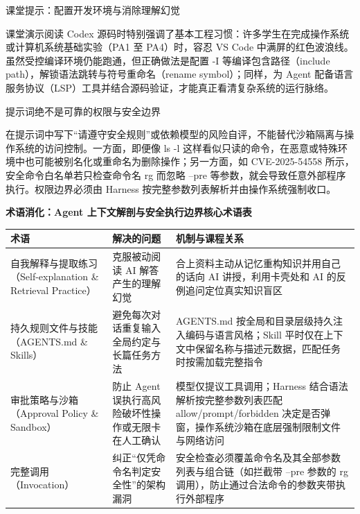 \documentclass[UTF8,a4paper,11pt,fontset=fandol]{ctexart}
\begin{document}
\begin{knowledgebox}{课堂提示：配置开发环境与消除理解幻觉}

课堂演示阅读 Codex 源码时特别强调了基本工程习惯：许多学生在完成操作系统或计算机系统基础实验（PA1 至 PA4）时，容忍 VS Code 中满屏的红色波浪线。虽然受控编译环境仍能跑通，但正确做法是配置 -I 等编译包含路径（include path），解锁语法跳转与符号重命名（rename symbol）；同样，为 Agent 配备语言服务协议（LSP）工具并结合源码验证，才能真正看清复杂系统的运行脉络。

\end{knowledgebox}

\begin{warningbox}{提示词绝不是可靠的权限与安全边界}

在提示词中写下“请遵守安全规则”或依赖模型的风险自评，不能替代沙箱隔离与操作系统的访问控制。一方面，即便像 ls -l 这样看似只读的命令，在恶意或特殊环境中也可能被别名化或重命名为删除操作；另一方面，如 CVE-2025-54558 所示，安全命令白名单若只检查命令名 rg 而忽略 --pre 等参数，就会导致任意外部程序执行。权限边界必须由 Harness 按完整参数列表解析并由操作系统强制收口。

\end{warningbox}

\par{}\textbf{术语消化：Agent 上下文解剖与安全执行边界核心术语表}

\begin{center}\small\begin{tabularx}{\linewidth}{YYY}

\toprule

术语 & 解决的问题 & 机制与课程关系\\\midrule

自我解释与提取练习（Self-explanation \& Retrieval Practice） & 克服被动阅读 AI 解答产生的理解幻觉 & 合上资料主动从记忆重构知识并用自己的话向 AI 讲授，利用卡壳处和 AI 的反例追问定位真实知识盲区\\[3pt]

持久规则文件与技能（AGENTS.md \& Skills） & 避免每次对话重复输入全局约定与长篇任务方法 & AGENTS.md 按全局和目录层级持久注入编码与语言风格；Skill 平时仅在上下文中保留名称与描述元数据，匹配任务时按需加载完整指令\\[3pt]

审批策略与沙箱（Approval Policy \& Sandbox） & 防止 Agent 误执行高风险破坏性操作或无限卡在人工确认 & 模型仅提议工具调用；Harness 结合语法解析按完整参数列表匹配 allow/prompt/forbidden 决定是否弹窗，操作系统沙箱在底层强制限制文件与网络访问\\[3pt]

完整调用（Invocation） & 纠正“仅凭命令名判定安全性”的架构漏洞 & 安全检查必须覆盖命令名及其全部参数列表与组合链（如拦截带 --pre 参数的 rg 调用），防止通过合法命令的参数夹带执行外部程序\\[3pt]

\bottomrule\end{tabularx}\end{center}
\end{document}
